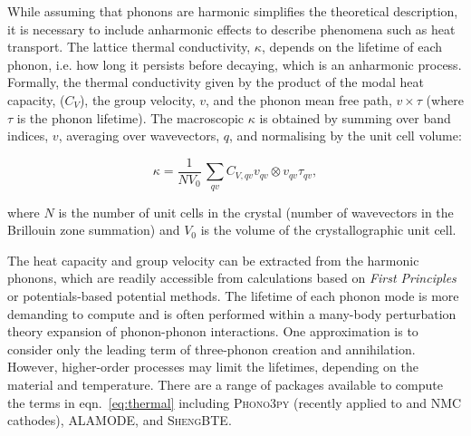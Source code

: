 \documentclass[../main.tex]{subfiles}
\begin{document}
While assuming that phonons are harmonic simplifies the theoretical description, it is necessary to include anharmonic effects to describe phenomena such as heat transport. The lattice thermal conductivity, $\kappa$, depends on the lifetime of each phonon, i.e. how long it persists before decaying, which is an anharmonic process. Formally, the thermal conductivity given by the product of the modal heat capacity, ($C_V$), the group velocity, $v$, and the phonon mean free path, $v \times \tau$ (where $\tau$ is the phonon lifetime). The macroscopic $\kappa$ is obtained by summing over band indices, $v$, averaging over wavevectors, $q$, and normalising by the unit cell volume:

\begin{equation}
    \kappa = \frac{1}{NV_0} \,\sum_{qv} C_{V,qv} v_{qv} \otimes v_{qv} \tau_{qv},
    \label{eq:thermal}
\end{equation}

where $N$ is the number of unit cells in the crystal (number of wavevectors in the Brillouin zone summation) and $V_0$ is the volume of the crystallographic unit cell.

The heat capacity and group velocity can be extracted from the harmonic phonons, which are readily accessible from calculations based on \textit{First Principles} or potentials-based potential methods. The lifetime of each phonon mode is more demanding to compute and is often performed within a many-body perturbation theory expansion of phonon-phonon interactions. One approximation is to consider only the leading term of three-phonon creation and annihilation. \cite{togo_distributions_2015} However, higher-order processes may limit the lifetimes, depending on the material and temperature. There are a range of packages available to compute the terms in eqn.~\ref{eq:thermal} including \textsc{Phono3py} \cite{togo_distributions_2015} (recently applied to  and NMC cathodes)\cite{yang2019highly,yang2020chemical}, \textsc{ALAMODE}\cite{tadano2014anharmonic}, and \textsc{ShengBTE}\cite{ShengBTE_2014}.

 
\end{document}
